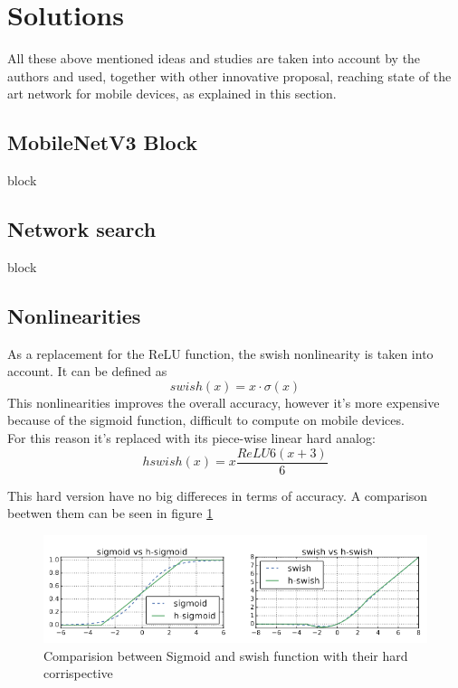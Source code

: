 \documentclass[12pt, letterpaper, twoside]{article}
\begin{document}
\clearpage
\section{Solutions}
All these above mentioned ideas and studies are taken into account by the authors and used, together with other innovative proposal, reaching state of the art network for mobile devices, as explained in this section.

\subsection{MobileNetV3 Block}
block

\subsection{Network search}
block

\subsection{Nonlinearities}
As a replacement for the ReLU function, the swish nonlinearity is taken into account. It can be defined as 
$$swish(x) = x \cdot \sigma(x)$$
This nonlinearities improves the overall accuracy, however it's more expensive because of the sigmoid function, difficult to compute on mobile devices. \\
For this reason it's replaced with its piece-wise linear hard analog:
$$hswish(x) = x \frac{ReLU6(x+3)}{6}$$

This hard version have no big differeces in terms of accuracy. A comparison beetwen them can be seen in figure \ref{fig:hswish_comparison}

\begin{figure}[h]
	\centering
	\includegraphics[width=1\textwidth]{hswish}
	\caption{Comparision between Sigmoid and swish function with their hard corrispective}
	\label{fig:hswish_comparison}
\end{figure}


\clearpage
\end{document}
